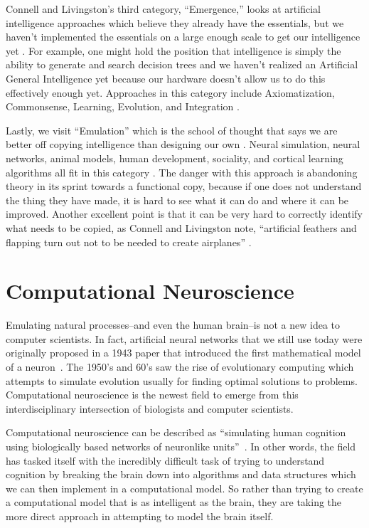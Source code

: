 \documentclass[oneside,12pt,openany]{book}
\begin{document}
	Connell and Livingston's third category, ``Emergence,'' looks at artificial intelligence approaches which believe they already have the essentials, but we haven't implemented the essentials on a large enough scale to get our intelligence yet \cite{Connell}. For example, one might hold the position that intelligence is simply the ability to generate and search decision trees and we haven't realized an Artificial General Intelligence yet because our hardware doesn't allow us to do this effectively enough yet. Approaches in this category include Axiomatization, Commonsense, Learning, Evolution, and Integration \cite{Connell}.
	
	Lastly, we visit ``Emulation'' which is the school of thought that says we are better off copying intelligence than designing our own \cite{Connell}. Neural simulation, neural networks, animal models, human development, sociality, and cortical learning algorithms all fit in this category \cite{Connell}. The danger with this approach is abandoning theory in its sprint towards a functional copy, because if one does not understand the thing they have made, it is hard to see what it can do and where it can be improved. Another excellent point is that it can be very hard to correctly identify what needs to be copied, as Connell and Livingston note, ``artificial feathers and flapping turn out not to be needed to create airplanes'' \cite{Connell}.
	
	\section{Computational Neuroscience}
	
	Emulating natural processes--and even the human brain--is not a new idea to computer scientists. In fact, artificial neural networks that we still use today were originally proposed in a 1943 paper that introduced the first mathematical model of a neuron~\cite{FundNatComp}. The 1950's and 60's saw the rise of evolutionary computing which attempts to simulate evolution usually for finding optimal solutions to problems. Computational neuroscience is the newest field to emerge from this interdisciplinary intersection of biologists and computer scientists.
	
	Computational neuroscience can be described as ``simulating human cognition using biologically based networks of neuronlike units''~\cite{Eberhart}. In other words, the field has tasked itself with the incredibly difficult task of trying to understand cognition by breaking the brain down into algorithms and data structures which we can then implement in a computational model. So rather than trying to create a computational model that is as intelligent as the brain, they are taking the more direct approach in attempting to model the brain itself.
	
\end{document}
